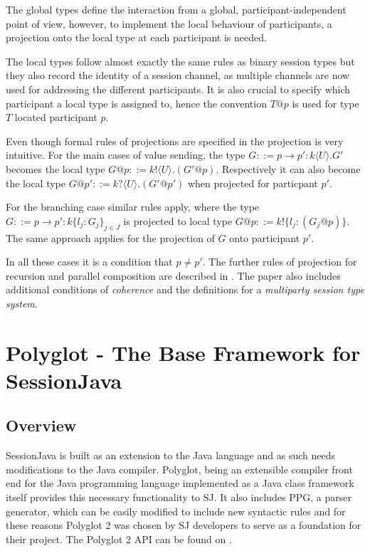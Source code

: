 The global types define the interaction from a global, participant-independent point of view, however, to implement the local behaviour of participants, a projection onto the local type at each participant is needed.

The local types follow almost exactly the same rules as binary session types but they also record the identity of a session channel, as multiple channels are now used for addressing the different participants. It is also crucial to specify which participant a local type is assigned to, hence the convention $ T @ p $  is used for type $T$ located participant $p$.

Even though formal rules of projections are specified in \cite{multiparty_sess_types} the projection is very intuitive. For the main cases of value sending, the type $G ::= p \rightarrow p' : k \langle U \rangle . G'$ becomes the local type $G @ p ::= k! \langle U \rangle . (G' @ p)$. Respectively it can also become the local type $G @ p' ::= k? \langle U \rangle . (G' @ p')$ when projected for particpant $p'$.

For the branching case similar rules apply, where the type $G::= p \rightarrow p' : k \lbrace l_{j}:G_{j} \rbrace _{j \in J} $ is projected to local type $G @ p ::= k! \lbrace l_{j}: (G_{j} @ p) \rbrace$. The same approach applies for the projection of $G$ onto participant $p'$.

In all these cases it is a condition that $p \neq p'$. The further rules of projection for recursion and parallel composition are described in \cite{multiparty_sess_types}. The paper also includes additional conditions of \textit{coherence} and the definitions for a \textit{multiparty session type system}.





\section{Polyglot - The Base Framework for SessionJava}
\label{sec:polyglot}

\subsection{Overview}
\label{subsec:polyglotoverview}
SessionJava is built as an extension to the Java language and as such needs modifications to the Java compiler. Polyglot, being an extensible compiler front end for the Java programming language implemented as a Java class framework \cite{polyglotonline} itself provides this necessary functionality to SJ. It also includes PPG, a parser generator, which can be easily modified to include new syntactic rules and for these reasons Polyglot 2 was chosen by SJ developers to serve as a foundation for their project. The Polyglot 2 API can be found on \cite{polyglotapi}.

